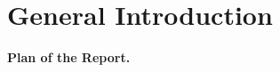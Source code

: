 
\chapter*{General Introduction}

\lipsum[1-3]

\vspace{0.5cm}
\noindent\textbf{Plan of the Report.}

\lipsum[4]
